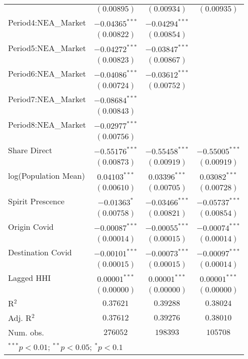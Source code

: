 \begin{tabular}{l c c c}
                     & $(0.00895)$      & $(0.00934)$      & $(0.00935)$      \\
Period4:NEA\_Market  & $-0.04365^{***}$ & $-0.04294^{***}$ &                  \\
                     & $(0.00822)$      & $(0.00854)$      &                  \\
Period5:NEA\_Market  & $-0.04272^{***}$ & $-0.03847^{***}$ &                  \\
                     & $(0.00823)$      & $(0.00867)$      &                  \\
Period6:NEA\_Market  & $-0.04086^{***}$ & $-0.03612^{***}$ &                  \\
                     & $(0.00724)$      & $(0.00752)$      &                  \\
Period7:NEA\_Market  & $-0.08684^{***}$ &                  &                  \\
                     & $(0.00843)$      &                  &                  \\
Period8:NEA\_Market  & $-0.02977^{***}$ &                  &                  \\
                     & $(0.00756)$      &                  &                  \\
Share Direct         & $-0.55176^{***}$ & $-0.55458^{***}$ & $-0.55005^{***}$ \\
                     & $(0.00873)$      & $(0.00919)$      & $(0.00919)$      \\
log(Population Mean) & $0.04103^{***}$  & $0.03396^{***}$  & $0.03082^{***}$  \\
                     & $(0.00610)$      & $(0.00705)$      & $(0.00728)$      \\
Spirit Prescence     & $-0.01363^{*}$   & $-0.03466^{***}$ & $-0.05737^{***}$ \\
                     & $(0.00758)$      & $(0.00821)$      & $(0.00854)$      \\
Origin Covid         & $-0.00087^{***}$ & $-0.00055^{***}$ & $-0.00074^{***}$ \\
                     & $(0.00014)$      & $(0.00015)$      & $(0.00014)$      \\
Destination Covid    & $-0.00101^{***}$ & $-0.00073^{***}$ & $-0.00097^{***}$ \\
                     & $(0.00015)$      & $(0.00015)$      & $(0.00014)$      \\
Lagged HHI           & $0.00001^{***}$  & $0.00001^{***}$  & $0.00001^{***}$  \\
                     & $(0.00000)$      & $(0.00000)$      & $(0.00000)$      \\
\hline
R$^2$                & $0.37621$        & $0.39288$        & $0.38024$        \\
Adj. R$^2$           & $0.37612$        & $0.39276$        & $0.38010$        \\
Num. obs.            & $276052$         & $198393$         & $105708$         \\
\hline
\multicolumn{4}{l}{\scriptsize{$^{***}p<0.01$; $^{**}p<0.05$; $^{*}p<0.1$}}
\end{tabular}

